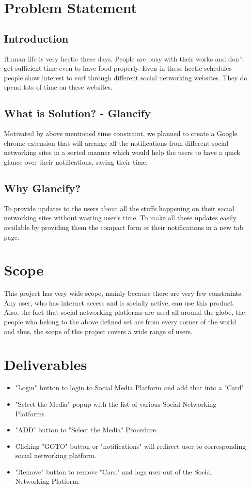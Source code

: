 \documentclass[12pt]{article}
\begin{document}
\section{Problem Statement}
\subsection{Introduction}
Human life is very hectic these days. People are busy with their works and don't get sufficient time even to have food properly. Even in these hectic schedules people show 
                         interest to surf through different social networking websites. They do spend lots of time on these websites.
                         
\subsection{What is Solution? - Glancify}
                       Motivated by above mentioned time constraint, we planned to create a Google chrome extension that will arrange all the notifications from different social networking sites
                         in a sorted manner which would help the users to have a quick glance over their notifications, saving their time.
\subsection{Why Glancify?}
To provide updates to the users about all the stuffs happening on their social networking sites without wasting user's time. To make all these updates easily available by providing them the compact form of their notifications in a new tab page.
\section{Scope}
This project has very wide scope, mainly because there are very few
constraints. Any user, who has internet access and is socially active, can
use this product. Also, the fact that social networking platforms are used
all around the globe, the people who belong to the above defined set are
from every corner of the world and thus, the scope of this project covers
a wide range of users.
\section{Deliverables}
\begin{itemize}
    \item "Login" button to login to Social Media Platform and add that into a "Card".
    \item "Select the Media" popup with the list of various Social Networking Platforms. 
    \item "ADD" button to "Select the Media" Procedure.
    \item Clicking "GOTO" button or "notifications" will redirect user to corresponding social networking platform.
    \item "Remove" button to remove "Card" and logs user out of the Social Networking Platform.
\end{itemize}
\end{document}
